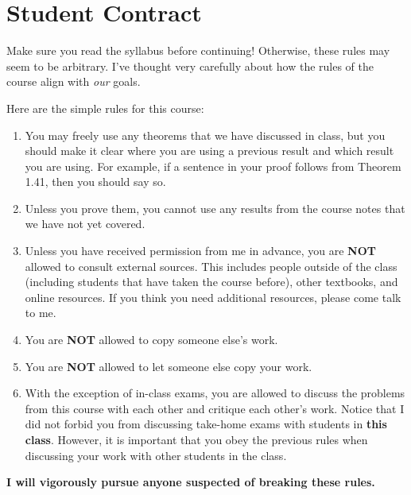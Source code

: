 \documentclass[11pt]{article}
\begin{document}
\section*{Student Contract}

\begin{center}
\end{center}

\noindent Make sure you read the syllabus before continuing!  Otherwise, these rules may seem to be arbitrary.  I've thought very carefully about how the rules of the course align with \emph{our} goals.

\bigskip

\noindent Here are the simple rules for this course:

\begin{enumerate}
\item You may freely use any theorems that we have discussed in class, but you should make it clear where you are using a previous result and which result you are using.  For example, if a sentence in your proof follows from Theorem 1.41, then you should say so.
\item Unless you prove them, you cannot use any results from the course notes that we have not yet covered.
\item Unless you have received permission from me in advance, you are \textbf{NOT} allowed to consult external sources.  This includes people outside of the class (including students that have taken the course before), other textbooks, and online resources.  If you think you need additional resources, please come talk to me.
\item You are \textbf{NOT} allowed to copy someone else's work.
\item You are \textbf{NOT} allowed to let someone else copy your work.
\item With the exception of in-class exams, you are allowed to discuss the problems from this course with each other and critique each other's work.  Notice that I did not forbid you from discussing take-home exams with students in \textbf{this class}.  However, it is important that you obey the previous rules when discussing your work with other students in the class.
\end{enumerate}

\begin{center}
\textbf{I will vigorously pursue anyone suspected of breaking these rules.}
\end{center}
\end{document}
